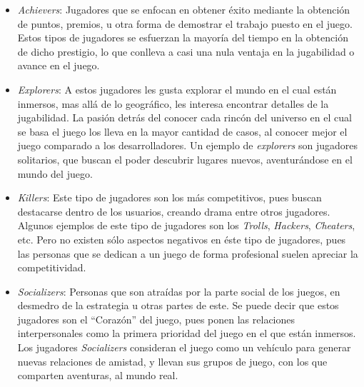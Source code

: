 \begin{itemize}
    \item \emph{Achievers}:
        Jugadores que se enfocan en obtener éxito mediante la obtención de puntos,
        premios, u otra forma de demostrar el trabajo puesto en el juego.
        Estos tipos de jugadores se esfuerzan la mayoría del tiempo en la obtención
        de dicho prestigio, lo que conlleva a casi una nula ventaja en la
        jugabilidad o avance en el juego.

    \item \emph{Explorers}:
        A estos jugadores les gusta explorar el mundo en el cual están inmersos,
        mas allá de lo geográfico, les interesa encontrar detalles de la
        jugabilidad.
        La pasión detrás del conocer cada rincón del universo en el cual se basa
        el juego los lleva en la mayor cantidad de casos, al conocer mejor el juego
        comparado a los desarrolladores.
        Un ejemplo de \emph{explorers} son jugadores solitarios, que buscan el
        poder descubrir lugares nuevos, aventurándose en el mundo del juego.

    \item \emph{Killers}:
        Este tipo de jugadores son los más competitivos, pues buscan destacarse
        dentro de los usuarios, creando drama entre otros jugadores.
        Algunos ejemplos de este tipo de jugadores son los \emph{Trolls},
        \emph{Hackers}, \emph{Cheaters}, etc.
        Pero no existen sólo aspectos negativos en éste tipo de jugadores,
        pues las personas que se dedican a un juego de forma profesional
        suelen apreciar la competitividad.

    \item \emph{Socializers}:
        Personas que son atraídas por la parte social de los juegos,
        en desmedro de la estrategia u otras partes de este.
        Se puede decir que estos jugadores son el ``Corazón'' del juego,
        pues ponen las relaciones interpersonales como la primera prioridad
        del juego en el que están inmersos.
        Los jugadores \emph{Socializers} consideran el juego
        como un vehículo para generar nuevas relaciones de amistad, y llevan
        sus grupos de juego, con los que comparten aventuras, al mundo real.

\end{itemize}

